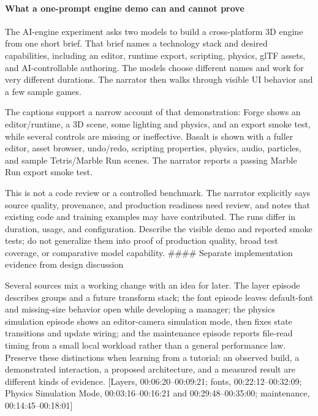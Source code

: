 \paragraph{What a one-prompt engine demo can and cannot prove}\label{06-engine-ii-ch042-what-a-one-prompt-engine-demo-can-and-cannot-prove}

\hypertarget{06-engine-ii-ch042-what-a-one-prompt-engine-demo-can-and-cannot-prove}{}

The AI-engine experiment asks two models to build a cross-platform 3D engine from one short brief. That brief names a technology stack and desired capabilities, including an editor, runtime export, scripting, physics, glTF assets, and AI-controllable authoring. The models choose different names and work for very different durations. The narrator then walks through visible UI behavior and a few sample games.

The captions support a narrow account of that demonstration: Forge shows an editor/runtime, a 3D scene, some lighting and physics, and an export smoke test, while several controls are missing or ineffective. Basalt is shown with a fuller editor, asset browser, undo/redo, scripting properties, physics, audio, particles, and sample Tetris/Marble Run scenes. The narrator reports a passing Marble Run export smoke test.

This is not a code review or a controlled benchmark. The narrator explicitly says source quality, provenance, and production readiness need review, and notes that existing code and training examples may have contributed. The runs differ in duration, usage, and configuration. Describe the visible demo and reported smoke tests; do not generalize them into proof of production quality, broad test coverage, or comparative model capability. \#\#\#\# Separate implementation evidence from design discussion

Several sources mix a working change with an idea for later. The layer episode describes groups and a future transform stack; the font episode leaves default-font and missing-size behavior open while developing a manager; the physics simulation episode shows an editor-camera simulation mode, then fixes state transitions and update wiring; and the maintenance episode reports file-read timing from a small local workload rather than a general performance law. Preserve these distinctions when learning from a tutorial: an observed build, a demonstrated interaction, a proposed architecture, and a measured result are different kinds of evidence. {[}Layers, 00:06:20--00:09:21; fonts, 00:22:12--00:32:09; Physics Simulation Mode, 00:03:16--00:16:21 and 00:29:48--00:35:00; maintenance, 00:14:45--00:18:01{]}

